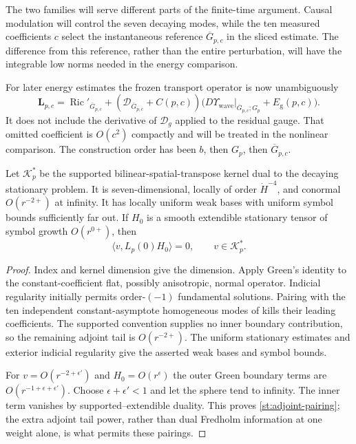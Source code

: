 The two families will serve different parts of the finite-time
argument.  Causal modulation will control the seven decaying modes,
while the ten measured coefficients $c$ select the instantaneous
reference $\overline G_{p,c}$ in the sliced estimate.  The difference
from this reference, rather than the entire perturbation, will have
the integrable low norms needed in the energy comparison.

For later energy estimates the frozen transport operator is now
unambiguously
\begin{equation}\label{st:frozen-operator}
 \mathbf L_{p,c}
 =\operatorname{Ric}'_{\overline G_{p,c}}
 +(\mathcal D_{\overline G_{p,c}}+C(p,c))
       \bigl(D\Upsilon_{\mathrm{wave}}|_{\overline G_{p,c};G_p}
                               +E_{\mathrm g}(p,c)\bigr).
\end{equation}
It does not include the derivative of $\mathcal D_g$ applied
to the residual gauge.  That omitted coefficient is
$O(c^2)$ compactly and will be treated in the nonlinear
comparison.  The construction order has been $b$, then $G_p$,
then $\overline G_{p,c}$.

\begin{lemma}\label{st:adjoint-tails}
Let $\mathcal K_p^*$ be the supported bilinear-spatial-transpose
kernel dual to the decaying stationary problem.  It is
seven-dimensional, locally of order $\dot H^{-4}$, and
conormal $O(r^{-2+})$ at infinity.  It has locally uniform
weak bases with uniform symbol bounds sufficiently far out.
If $H_0$ is a smooth extendible stationary tensor of symbol
growth $O(r^{0+})$, then
\begin{equation}\label{st:adjoint-pairing}
 \langle v,L_p(0)H_0\rangle=0,\qquad v\in\mathcal K_p^*.
\end{equation}
\end{lemma}

\begin{proof}
Index and kernel dimension give the dimension. Apply Green's identity
to the constant-coefficient flat, possibly anisotropic, normal operator.  Indicial regularity
initially permits order-$(-1)$ fundamental solutions.  Pairing
with the ten independent constant-asymptote homogeneous modes of
 kills their leading coefficients.  The supported convention
supplies no inner boundary contribution, so the remaining
adjoint tail is $O(r^{-2+})$.  The uniform stationary estimates
and exterior indicial regularity give the asserted weak bases
and symbol bounds.

For $v=O(r^{-2+\epsilon'})$ and $H_0=O(r^\epsilon)$ the outer
Green boundary terms are $O(r^{-1+\epsilon+\epsilon'})$.
Choose $\epsilon+\epsilon'<1$ and let the sphere tend to
infinity.  The inner term vanishes by supported--extendible
duality.  This proves \eqref{st:adjoint-pairing}; the extra
adjoint tail power, rather than dual Fredholm information at
one weight alone, is what permits these pairings.
\end{proof}

